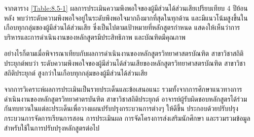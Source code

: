 จากตาราง \ref{Table:8.5-1} ผลการประเมินความพึงพอใจของผู้มีส่วนได้ส่วนเสียเปรียบเทียบ 4 ปีย้อนหลัง พบว่าระดับความพึงพอใจอยู่ในระดับพึงพอใจมากถึงมากที่สุดในทุกด้าน และมีแนวโน้มสูงขึ้นในเกือบทุกกลุ่มของผู้มีส่วนได้ส่วนเสีย ซึ่งเป็นไปตามเป้าหมายที่หลักสูตรกำหนด แสดงให้เห็นว่าการบริหารและการดำเนินงานของหลักสูตรมีประสิทธิภาพ และบัณฑิตมีคุณภาพ

อย่างไรก็ตามเมื่อพิจารณาเทียบกับผลการดำเนินงานของหลักสูตรวิทยาศาสตรบัณฑิต สาขาวิชาสถิติประยุกต์พบว่า ระดับความพึงพอใจของผู้มีส่วนได้ส่วนเสียของหลักสูตรวิทยาศาสตรบัณฑิต สาขาวิชาสถิติประยุกต์ สูงกว่าในเกือบทุกกลุ่มของผู้มีส่วนได้ส่วนเสีย 


จากการวิเคราะห์ผลการประเมินเป็นรายประเด็นและข้อเสนอแนะ รวมทั้งจากการศึกษาแนวทางการดำเนินงานของหลักสูตรวิทยาศาตรบันฑิต สาขาวิชาสถิติประยุกต์ อาจารย์ผู้รับผิดชอบหลักสูตรได้ร่วมกันทบทวนในแต่ละประเด็นเพื่อวางแผนปรับปรุงกระบวนการต่างๆ ให้ดีขึ้น ประกอบด้วยปรับปรุงกระบวนการจัดการเรียนการสอน การประเมินผล  การจัดโครงการส่งเสริมนักศึกษา และรวมรวมข้อมูลสำหรับใช้ในการปรับปรุงหลักสูตรต่อไป 



\begin{doclist}
\end{doclist}


